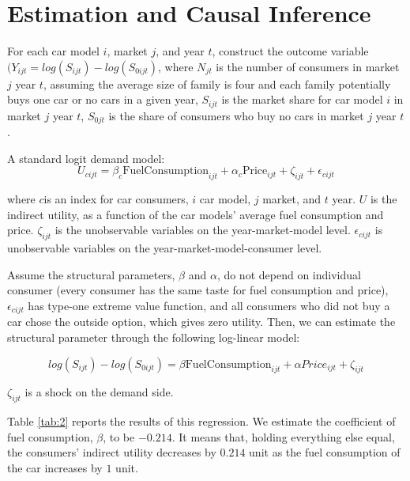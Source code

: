 \documentclass[12pt]{article}
\begin{document}
\section{Estimation and Causal
Inference}\label{estimation-and-causal-inference}

For each car model $i$, market $j$, and year $t$, construct the outcome variable $(Y_{ijt} = log(S_{ijt}) - log(S_{0ijt})$, where $N_{jt}$ is the number of consumers in market $j$ year $t$, assuming the average size of family is four and each family potentially buys one car or no cars in a given year, $S_{ijt}$ is the market share for car model $i$ in market $j$ year $t$, $S_{0jt}$ is the share of consumers who buy no cars in market $j$ year $t$.

A standard logit demand model: 
\begin{equation*}
U_{cijt} = \beta_c \text{FuelConsumption}_{ijt} + \alpha_c \text{Price}_{ijt} + \zeta_{ijt} + \epsilon_{cijt}
\end{equation*}

where $c$is an index for car consumers, $i$ car model, $j$ market, and $t$ year. $U$ is the indirect utility, as a function of
the car models' average fuel consumption and price. $\zeta_{ijt}$ is the unobservable variables on the year-market-model level.  $\epsilon_{cijt}$ is unobservable variables on the year-market-model-consumer level.

Assume the structural parameters, $\beta$ and $\alpha$, do not
depend on individual consumer (every consumer has the same taste for
fuel consumption and price), $\epsilon_{cijt}$ has type-one extreme
value function, and all consumers who did not buy a car chose the
outside option, which gives zero utility. Then, we can estimate the
structural parameter through the following log-linear model:

\begin{equation} \label{eqn:1}
log(S_{ijt}) - log(S_{0ijt}) = \beta \text{FuelConsumption}_{ijt} + \alpha Price_{ijt} + \zeta_{ijt}
\end{equation}

$\zeta_{ijt}$ is a shock on the demand side.

Table \ref{tab:2} reports the results of this regression. We estimate the coefficient of fuel consumption, $\beta$, to be
$-0.214$. It means that, holding everything else equal, the consumers' indirect utility decreases by $0.214$ unit as the fuel consumption of the car increases by $1$ unit.

\begin{table}[H]
\centering

\end{table}
\end{document}
